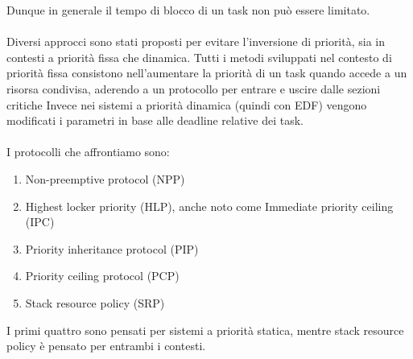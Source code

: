 \documentclass[12pt,openany,onesided]{book}
\begin{document}
Dunque in generale il tempo di blocco di un task non può essere limitato.
\\ \\
Diversi approcci sono stati proposti per evitare l'inversione di priorità, sia in contesti a priorità fissa che dinamica.
Tutti i metodi sviluppati nel contesto di priorità fissa consistono nell'aumentare la priorità di un task quando accede a un risorsa condivisa, aderendo a un protocollo per entrare e uscire dalle sezioni critiche
Invece nei sistemi a priorità dinamica (quindi con EDF) vengono modificati i parametri in base alle deadline relative dei task.
\\\\
I protocolli che affrontiamo sono:
\begin{enumerate}
    \item Non-preemptive protocol (NPP)
    \item Highest locker priority (HLP), anche noto come Immediate priority ceiling (IPC)
    \item Priority inheritance protocol (PIP)
    \item Priority ceiling protocol (PCP)
    \item Stack resource policy (SRP)
\end{enumerate}
I primi quattro sono pensati per sistemi a priorità statica, mentre stack resource policy è pensato per entrambi i contesti.
\end{document}
